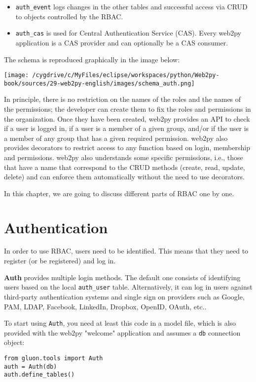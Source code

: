 \documentclass[justified,sixbynine,notoc]{tufte-book}
\def\ft{\small\tt}
\begin{document}
\begin{fullwidth}
\begin{itemize}
\item {\ft auth\_event} logs changes in the other tables and successful access via CRUD to objects controlled by the RBAC.

\item {\ft auth\_cas} is used for Central Authentication Service (CAS). Every web2py application is a CAS provider and can optionally be a CAS consumer.
\end{itemize}

The schema is reproduced graphically in the image below:


\goodbreak\begin{center}\texttt{[image: /cygdrive/c/MyFiles/eclipse/workspaces/python/Web2py-book/sources/29-web2py-english/images/schema\_auth.png]}\end{center}


In principle, there is no restriction on the names of the roles and the names of the permissions; the developer can create them to fix the roles and permissions in the organization. Once they have been created, web2py provides an API to check if a user is logged in, if a user is a member of a given group, and/or if the user is a member of any group that has a given required permission.
\noindent web2py also provides decorators to restrict access to any function based on login, membership and permissions.
\noindent web2py also understands some specific permissions, i.e., those that have a name that correspond to the CRUD methods (create, read, update, delete) and can enforce them automatically without the need to use decorators.

In this chapter, we are going to discuss different parts of RBAC one by one.

\goodbreak\section{Authentication}

In order to use RBAC, users need to be identified. This means that they need to register (or be registered) and log in.

{\bf Auth} provides multiple login methods. The default one consists of identifying users based on the local {\ft auth\_user} table.
Alternatively, it can log in users against third-party authentication systems and single sign on providers such as Google, PAM, LDAP, Facebook, LinkedIn, Dropbox, OpenID, OAuth, etc..

To start using {\ft Auth}, you need at least this code in a model file, which is also provided with the web2py "welcome" application and assumes a {\ft db} connection object:
\begin{lstlisting}
from gluon.tools import Auth
auth = Auth(db)
auth.define_tables()
\end{lstlisting}


\end{fullwidth}
\end{document}
